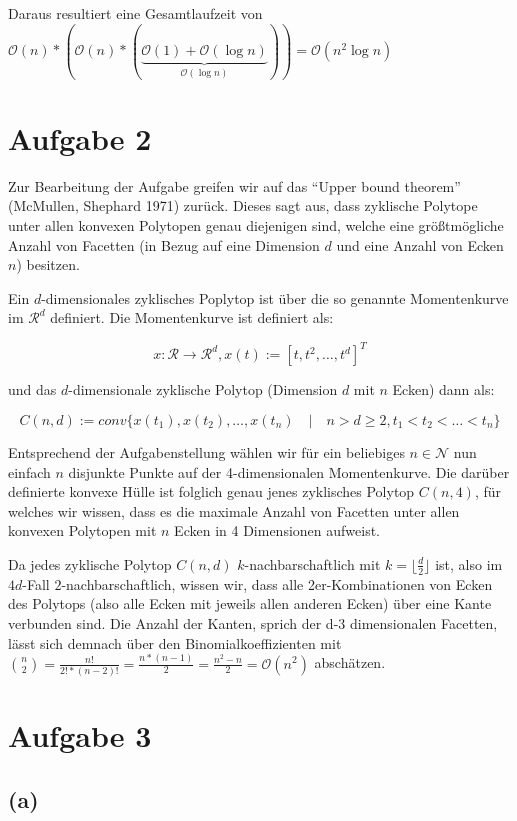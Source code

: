\documentclass[a4paper]{article}
\begin{document}
 Daraus resultiert eine Gesamtlaufzeit von $\mathcal{O}(n) * (\mathcal{O}(n) * (\underbrace{\mathcal{O}(1) + \mathcal{O}(\log n)}_{\mathcal{O}(\log n)})) = \mathcal{O}(n^2 \log n)$



\section*{Aufgabe 2}

Zur Bearbeitung der Aufgabe greifen wir auf das "`Upper bound theorem"' (McMullen, Shephard 1971) zurück.
Dieses sagt aus, dass zyklische Polytope unter allen konvexen Polytopen genau diejenigen sind, welche eine größtmögliche Anzahl von Facetten (in Bezug auf eine Dimension $d$ und eine Anzahl von
Ecken $n$) besitzen.

Ein $d$-dimensionales zyklisches Poplytop ist über die so genannte Momentenkurve im $\mathcal{R}^d$ definiert. Die Momentenkurve ist definiert als:

$$x: \mathcal{R} \rightarrow \mathcal{R}^d, x(t) := [t, t^2, \dots, t^d]^T$$

und das $d$-dimensionale zyklische Polytop (Dimension $d$ mit $n$ Ecken) dann als:

$$C(n,d) := conv\{x(t_1), x(t_2), \dots, x(t_n) \quad|\quad n > d \geq 2, t_1 < t_2 < \dots < t_n\}$$

Entsprechend der Aufgabenstellung wählen wir für ein beliebiges $n \in \mathcal{N}$ nun
einfach $n$ disjunkte Punkte auf der 4-dimensionalen Momentenkurve. 
Die darüber definierte konvexe Hülle ist folglich genau jenes zyklisches Polytop $C(n,4)$, 
für welches wir wissen, dass es die maximale Anzahl von Facetten unter allen konvexen Polytopen
mit $n$ Ecken in 4 Dimensionen aufweist. 

Da jedes zyklische Polytop $C(n,d)$ $k$-nachbarschaftlich mit $k = \lfloor\frac{d}{2}\rfloor $ ist, also im $4
d$-Fall
$2$-nachbarschaftlich, wissen wir, dass alle 2er-Kombinationen von Ecken des Polytops
(also alle Ecken mit jeweils allen anderen Ecken) über eine Kante verbunden sind. Die Anzahl der Kanten, sprich der d-3 dimensionalen
Facetten, lässt sich demnach über den Binomialkoeffizienten mit $\binom{n}{2} = \frac{n!}{2! * (n-2)!}
= \frac{n * (n-1)}{2} = \frac{n^2 - n}{2} = \mathcal{O}(n^2)$ abschätzen. 

\section*{Aufgabe 3}
\subsection*{(a)}
\end{document}
